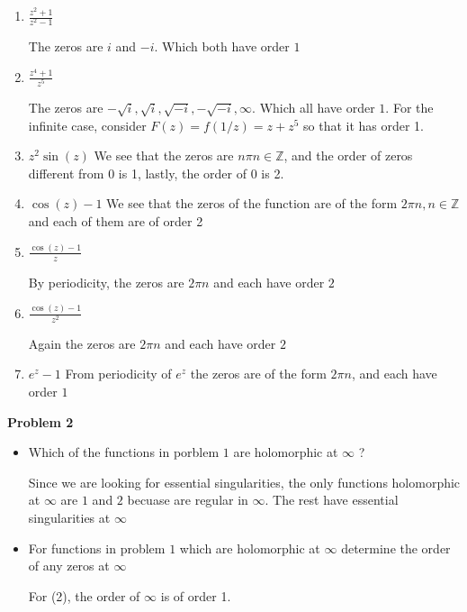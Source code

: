 \documentclass[notitlepage]{article}
\theoremstyle{definition}
\theoremstyle{remark}
\newcommand{\ZZ}{\mathbb{Z}}
\begin{document}
\begin{enumerate}
	\item $ \frac{z^2 +1}{z^2 - 1} $
	
	The zeros are $ i $ and $ -i $. Which both have order $ 1 $
	\item $ \frac{z^4 + 1}{z^5} $
	
	The zeros are $ -\sqrt{i}, \sqrt{i}, \sqrt{-i}, - \sqrt{-i}, \infty $. Which all have order $ 1 $. For the infinite case, consider $ F(z) = f(1/z)  = z + z^5 $ so that it has order 1.
	\item $ z^2 \sin(z) $
	We see that the zeros are $ n\pi n \in \ZZ $, and the order of zeros different from 0 is 1, lastly, the order of 0 is 2.
	\item $ \cos(z) -1 $
	We see that the zeros of the function are of the form $ 2 \pi n, n \in \ZZ $ and each of them are of order 2
	\item $ \frac{\cos(z) -1 }{z} $
	
	By periodicity, the zeros are $ 2 \pi n $ and each have order $ 2 $
	\item $ \frac{\cos(z) -1 }{z^2} $
	
	Again the zeros are $ 2 \pi n $ and each have order $ 2 $
	
	\item $ e^z - 1 $
	From periodicity of $ e^z $ the zeros are of the form $ 2 \pi n $, and each have order $ 1 $
\end{enumerate}

\textbf{\large Problem 2}

\begin{itemize}
	\item Which of the functions in porblem $ 1 $ are holomorphic at $ \infty $ ?
	
	Since we are looking for essential singularities, the only functions holomorphic at $ \infty $ are $ 1 $ and $ 2 $ becuase are regular in $ \infty $. The rest have essential singularities at  $ \infty $
	
	\item For functions in problem $ 1 $ which are holomorphic at $ \infty $ determine the order of any zeros at $ \infty $
	
	For (2), the order of $ \infty $ is of order 1.
\end{itemize}
\end{document}
